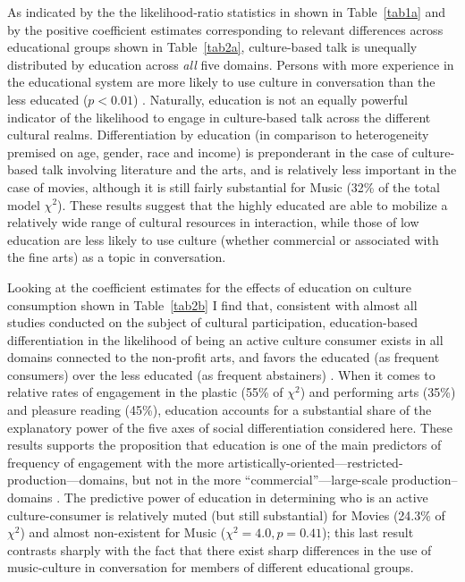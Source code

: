 \documentclass[11pt]{article}
\begin{document}
As indicated by the the likelihood-ratio statistics in shown in Table~\ref{tab1a} and by the positive coefficient estimates corresponding to relevant differences across educational groups shown in Table~\ref{tab2a}, culture-based talk is unequally distributed by education across \emph{all} five domains.  Persons with more experience in the educational system are more likely to use culture in conversation than the less educated ($p<0.01$) \citep{collins75, dimaggio96}.   Naturally, education is not an equally powerful indicator of the likelihood to engage in culture-based talk across the different cultural realms.  Differentiation by education (in comparison to heterogeneity premised on age, gender, race and income) is preponderant in the case of culture-based talk involving literature and the arts, and is relatively less important in the case of movies, although it is still fairly substantial for Music (32\% of the total model $\chi^{2}$).  These results suggest that the highly educated are able to mobilize a relatively wide range of cultural resources in interaction, while those of low education are less likely to use culture (whether commercial or associated with the fine arts) as a topic in conversation. 

Looking at the coefficient estimates for the effects of education on culture consumption shown in Table~\ref{tab2b} I find that, consistent with almost all studies conducted on the subject of cultural participation, education-based differentiation in the likelihood of being an active culture consumer exists in all domains connected to the non-profit arts, and favors the educated (as frequent consumers) over the less educated (as frequent abstainers) \citep{baumol_bowen66, dimaggio_useem78a, bourdieu_darbel91}.  When it comes to relative rates of engagement in the plastic (55\% of $\chi^{2}$) and performing arts (35\%) and pleasure reading (45\%), education accounts for a substantial share of the explanatory power of the five axes of social differentiation considered here.  These results supports the proposition that education is one of the main predictors of frequency of engagement with the more artistically-oriented---restricted-production---domains, but not in the more ``commercial''---large-scale production--domains \citep{bourdieu84, bourdieu93a, lizardo_skiles09}.  The predictive power of education in determining who is an active culture-consumer is relatively muted (but still substantial) for Movies (24.3\% of $\chi^{2}$) and almost non-existent for Music  ($\chi^{2}=4.0, p=0.41$); this last result contrasts sharply  with the fact that there exist sharp differences in the use of music-culture in conversation for members of different educational groups.  
\end{document}
